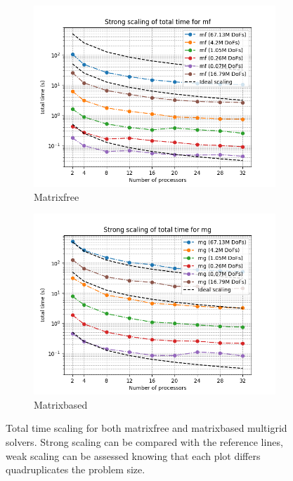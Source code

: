 \begin{figure}[h]
     \centering
     \begin{subfigure}[h]{0.5\textwidth}
         \centering
         \includegraphics[width=\textwidth]{figure/strong_mf_total.png}
         \caption{Matrixfree}
     \end{subfigure}
     \hspace*{-0.4cm}
     \begin{subfigure}[h]{0.5\textwidth}
         \centering
         \includegraphics[width=\textwidth]{figure/strong_mg_total.png}
         \caption{Matrixbased}
     \end{subfigure}
     \caption{Total time scaling for both matrixfree and matrixbased multigrid solvers. Strong scaling can be compared with the reference lines, weak scaling can be assessed knowing that each plot differs quadruplicates the problem size.}
     \label{fig:strong_mg_mf}
\end{figure}
